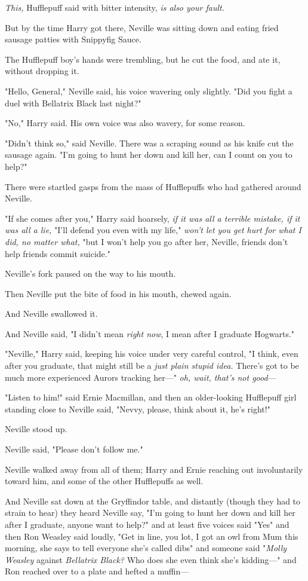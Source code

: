\emph{This,} Hufflepuff said with bitter intensity, \emph{is also your fault.}

But by the time Harry got there, Neville was sitting down and eating fried 
sausage patties with Snippyfig Sauce.

The Hufflepuff boy's hands were trembling, but he cut the food, and ate it, 
without dropping it.

"Hello, General," Neville said, his voice wavering only slightly. "Did you 
fight a duel with Bellatrix Black last night?"

"No," Harry said. His own voice was also wavery, for some reason.

"Didn't think so," said Neville. There was a scraping sound as his knife cut 
the sausage again. "I'm going to hunt her down and kill her, can I count on you 
to help?"

There were startled gasps from the mass of Hufflepuffs who had gathered around 
Neville.

"If she comes after you," Harry said hoarsely, \emph{if it was all a terrible 
mistake, if it was all a lie,} "I'll defend you even with my life," \emph{won't 
let you get hurt for what I did, no matter what,} "but I won't help you go 
after her, Neville, friends don't help friends commit suicide."

Neville's fork paused on the way to his mouth.

Then Neville put the bite of food in his mouth, chewed again.

And Neville swallowed it.

And Neville said, "I didn't mean \emph{right now}, I mean after I graduate 
Hogwarts."

"Neville," Harry said, keeping his voice under very careful control, "I think, 
even after you graduate, that might still be a \emph{just plain stupid idea.} 
There's got to be much more experienced Aurors tracking her---" \emph{oh, wait, 
that's not good}---

"Listen to him!" said Ernie Macmillan, and then an older-looking Hufflepuff 
girl standing close to Neville said, "Nevvy, please, think about it, he's 
right!"

Neville stood up.

Neville said, "Please don't follow me."

Neville walked away from all of them; Harry and Ernie reaching out 
involuntarily toward him, and some of the other Hufflepuffs as well.

And Neville sat down at the Gryffindor table, and distantly (though they had to 
strain to hear) they heard Neville say, "I'm going to hunt her down and kill 
her after I graduate, anyone want to help?" and at least five voices said "Yes" 
and then Ron Weasley said loudly, "Get in line, you lot, I got an owl from Mum 
this morning, she says to tell everyone she's called dibs" and someone said 
"\emph{Molly Weasley} against \emph{Bellatrix Black?} Who does she even think 
she's kidding---" and Ron reached over to a plate and hefted a muffin---

